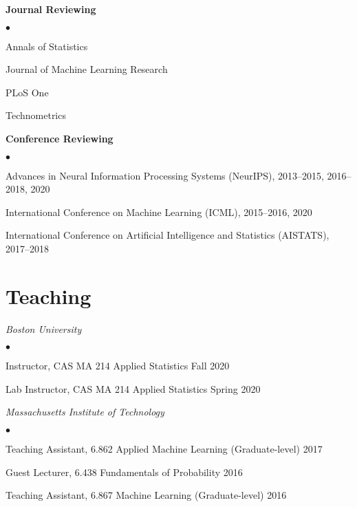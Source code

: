 \documentclass[margin,line]{res}
\newenvironment{list2}{
  \begin{list}{$\bullet$}{%
      \setlength{\itemsep}{0in}
      \setlength{\parsep}{0in} \setlength{\parskip}{0in}
      \setlength{\topsep}{0in} \setlength{\partopsep}{0in}
      \setlength{\leftmargin}{0.2in}}}{\end{list}}
\begin{document}
\begin{resume}
\textbf{Journal Reviewing}
\begin{list2}
\item Annals of Statistics
\item Journal of Machine Learning Research
\item PLoS One
\item Technometrics
\end{list2}

\textbf{Conference Reviewing}
\begin{list2}
\item Advances in Neural Information Processing Systems (NeurIPS), 2013--2015, 2016--2018, 2020
\item International Conference on Machine Learning (ICML), 2015--2016, 2020
\item International Conference on Artificial Intelligence and Statistics (AISTATS), 2017--2018
\end{list2}

%

\section{\sc Teaching}

\emph{Boston University}
\begin{list2}
\item Instructor, CAS MA 214 Applied Statistics \hfill Fall 2020
\item Lab Instructor, CAS MA 214 Applied Statistics \hfill Spring 2020
\end{list2}

\emph{Massachusetts Institute of Technology}
\begin{list2}
\item Teaching Assistant, 6.862 Applied Machine Learning (Graduate-level) \hfill 2017
\item Guest Lecturer, 6.438 Fundamentals of Probability \hfill 2016
\item Teaching Assistant, 6.867 Machine Learning (Graduate-level) \hfill 2016
\end{list2}


\end{resume}
\end{document}
